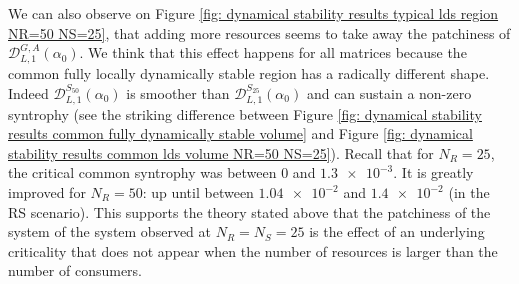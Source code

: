 \documentclass[12pt, titlepage]{report}
\begin{document}
We can also observe on Figure \ref{fig: dynamical stability results typical lds region NR=50 NS=25}, that adding more resources seems to take away the patchiness of $\mathcal{D}_{L,1}^{G,A}(\alpha_0)$. We think that this effect happens for all matrices because the common fully locally dynamically stable region has a radically different shape. Indeed $\mathcal{D}_{L,1}^{S_{50}}(\alpha_0)$ is smoother than $\mathcal{D}_{L,1}^{S_{25}}(\alpha_0)$ and can sustain a non-zero syntrophy (see the striking difference between Figure \ref{fig: dynamical stability results common fully dynamically stable volume} and Figure \ref{fig: dynamical stability results common lds volume NR=50 NS=25}). Recall that  for $N_R=25$, the critical common syntrophy was between $0$ and $\num{1.3e-3}$. It is greatly improved for $N_R=50$: up until between $\num{1.04e-2}$ and $\num{1.4e-2}$ (in the RS scenario). This supports the theory stated above that the patchiness of the system of the system observed at $N_R=N_S=25$ is the effect of an underlying criticality that does not appear when the number of resources is larger than the number of consumers.
\end{document}

